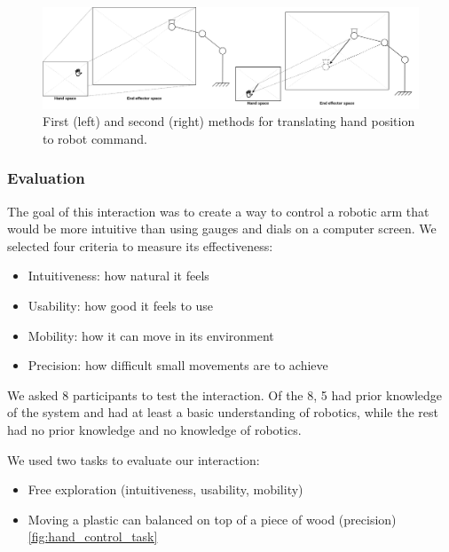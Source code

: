 \begin{figure}
    \centering
    \includegraphics{images/hand_control_methods.png}
    \caption{First (left) and second (right) methods for translating hand position to robot command.}
    \label{fig:hand_control_methods}
\end{figure}


\subsubsection{Evaluation}

The goal of this interaction was to create a way to control a robotic arm that would be more intuitive than using gauges and dials on a computer screen. We selected four criteria to measure its effectiveness:

\begin{itemize}
    \item Intuitiveness: how natural it feels
    \item Usability: how good it feels to use
    \item Mobility: how it can move in its environment
    \item Precision: how difficult small movements are to achieve
\end{itemize}

We asked 8 participants to test the interaction. Of the 8, 5 had prior knowledge of the system and had at least a basic understanding of robotics, while the rest had no prior knowledge and no knowledge of robotics.

We used two tasks to evaluate our interaction:

\begin{itemize}
    \item Free exploration (intuitiveness, usability, mobility)
    \item Moving a plastic can balanced on top of a piece of wood (precision) \ref{fig:hand_control_task}
\end{itemize}

